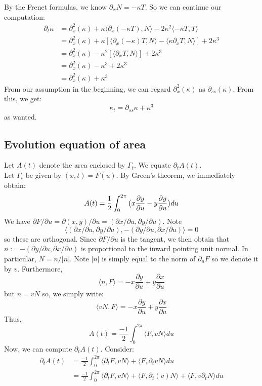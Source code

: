 \documentclass{article}
\begin{document}
By the Frenet formulas, we know $\partial_x N = -\kappa T$. So we can continue our computation:
\begin{align*}
	\partial_t \kappa &= \partial_x^2 (\kappa) + \kappa\langle \partial_x(-\kappa T), N\rangle - 2\kappa^2\langle -\kappa T, T\rangle \\
		&= \partial_x^2 (\kappa) + \kappa[\langle \partial_x (-\kappa)T, N\rangle - \langle \kappa \partial_x T, N\rangle] + 2\kappa^3 \\
		&= \partial_x^2 (\kappa) - \kappa^2[\langle \partial_x T, N\rangle] + 2\kappa^3 \\
		&= \partial_x^2 (\kappa) - \kappa^3 + 2\kappa^3 \\
		&= \partial_x^2 (\kappa) + \kappa^3
\end{align*}
From our assumption in the beginning, we can regard $\partial_x^2 (\kappa)$ as $\partial_{ss} (\kappa)$. From this, we get:
\[ \kappa_t = \partial_{ss} \kappa + \kappa^3 \]
as wanted.

\subsection{Evolution equation of area}

Let $A(t)$ denote the area enclosed by $\Gamma_t$. We equate $\partial_t A(t)$.\\

Let $\Gamma_t$ be given by $(x,t) = F(u)$. By Green's theorem, we immediately obtain:
\[ A(t) = \frac{1}{2} \int_{0}^{2\pi} \big{(}x\frac{\partial y}{\partial u} - y\frac{\partial y}{\partial u}\big{)}du \]
We have $\partial F/\partial u = \partial (x,y) / \partial u = (\partial x/\partial u, \partial y/\partial u)$. Note 
\[ \langle (\partial x/\partial u, \partial y/\partial u),-(\partial y/\partial u, \partial x/\partial u)\rangle=0 \]
so these are orthogonal. Since $\partial F/\partial u$ is the tangent, we then obtain that $n := -(\partial y/\partial u, \partial x/\partial u)$ is proportional to the inward pointing unit normal.
In particular, $N = n/|n|$. Note $|n|$ is simply equal to the norm of $\partial_u F$ so we denote it by $v$. Furthermore,
\[ \langle n, F\rangle = -x \frac{\partial y}{\partial u} + y\frac{\partial x}{\partial u} \]
but $n = vN$ so, we simply write:
\[ \langle vN, F\rangle = -x \frac{\partial y}{\partial u} + y\frac{\partial x}{\partial u} \]
Thus,
\[ A(t) = \frac{-1}{2} \int_0^{2\pi} \langle F, vN\rangle du \]
Now, we can compute $\partial_t A(t)$. Consider:
\begin{align*}
	\partial_t A(t) &= \frac{-1}{2} \int_0^{2\pi} \langle \partial_t F, vN\rangle + \langle F, \partial_t vN\rangle du \\
		&= \frac{-1}{2} \int_0^{2\pi} \langle \partial_t F, vN\rangle + \langle F, \partial_t (v)N\rangle +  \langle F, v\partial_t N\rangle du
\end{align*}
\end{document}
